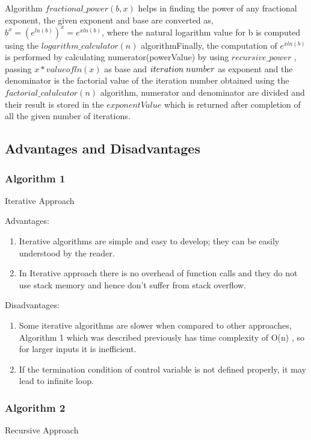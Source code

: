 \documentclass[12pt, a4paper]{article}
\begin{document}
\newpage
Algorithm $fractional\_power(b,x) $ helps in finding the power of any fractional exponent, the given exponent and base are converted as, $b^x = (e^{ln(b)})^x = e^{xln(b)} $, where the natural logarithm value for b is computed using the $logarithm\_calculator(n) $ algorithmFinally, the computation of $e^{xln(b)} $ is performed by calculating numerator(powerValue) by using $recursive\_power$ , passing $x * value of ln(x) $ as base and $iteration \hspace{1mm} number$ as exponent and the denominator is the factorial value of the iteration number obtained using the $factorial\_calulcator(n)$ algorithm, numerator and denominator are divided and their result is stored in the $exponentValue$ which is returned after completion of all the given number of iterations.

\subsection{Advantages and Disadvantages}



\subsubsection{Algorithm 1}
Iterative Approach

Advantages:
\begin{enumerate}
    \item {Iterative algorithms are simple and easy to develop; they can be easily understood by the reader.}
    \item {In Iterative approach there is no overhead of function calls and they do not use stack memory and hence don’t suffer from stack overflow.}
    
\end{enumerate}

Disadvantages:
\begin{enumerate}
    \item {Some iterative algorithms are slower when compared to other approaches, Algorithm 1 which was described previously has time complexity of O(n) , so for larger inputs it is inefficient.}
    \item {If the termination condition of control variable is not defined properly, it may lead to infinite loop.}
    
\end{enumerate}

\subsubsection{Algorithm 2}
Recursive Approach 
\end{document}
